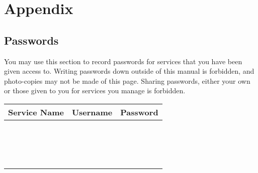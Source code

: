 \section{Appendix}

\subsection{Passwords}

You may use this section to record passwords for services that you have been given access to.  Writing passwords down outside of this manual is forbidden, and photo-copies may not be made of this page. Sharing passwords, either your own or those given to you for services you manage is forbidden.

\begin{center}
	\renewcommand{\arraystretch}{2}
	\begin{tabularx}{\textwidth}{|p{5cm}|X|X|}
		\hline 
		Service Name & Username & Password \\ 
		\hline 
		&  &  \\ 
		\hline 
		&  &  \\ 
		\hline 
		&  &  \\ 
		\hline 
		&  &  \\ 
		\hline 
		&  &  \\ 
		\hline 
		&  &  \\ 
		\hline 
		&  &  \\ 
		\hline 
		&  &  \\ 
		\hline 
		&  &  \\ 
		\hline 
		&  &  \\ 
		\hline 
		&  &  \\ 
		\hline 
		&  &  \\ 
		\hline 
		&  &  \\ 
		\hline 
		&  &  \\ 
		\hline 
		&  &  \\ 
		\hline 
		&  &  \\ 
		\hline 
	\end{tabularx} 
\end{center}